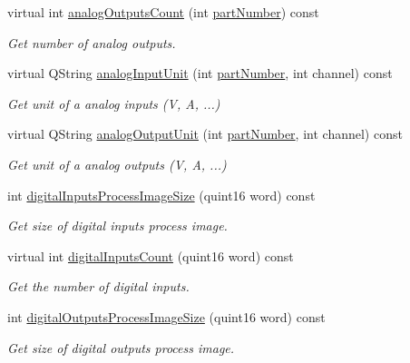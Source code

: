 \begin{DoxyCompactItemize}
virtual int \hyperlink{classmdt_device_modbus_wago_module_ab97fe52c4538a80ccdf5fa1b04c119b6}{analog\-Outputs\-Count} (int \hyperlink{classmdt_device_modbus_wago_module_ab694800ebccf308beb9eeb9a789b0442}{part\-Number}) const 
\begin{DoxyCompactList}\small\item\em Get number of analog outputs. \end{DoxyCompactList}\item 
virtual Q\-String \hyperlink{classmdt_device_modbus_wago_module_adbf2b96c5ab43a1693b5d656f84e893d}{analog\-Input\-Unit} (int \hyperlink{classmdt_device_modbus_wago_module_ab694800ebccf308beb9eeb9a789b0442}{part\-Number}, int channel) const 
\begin{DoxyCompactList}\small\item\em Get unit of a analog inputs (V, A, ...) \end{DoxyCompactList}\item 
virtual Q\-String \hyperlink{classmdt_device_modbus_wago_module_a239892e92ee3f062e1000301766877aa}{analog\-Output\-Unit} (int \hyperlink{classmdt_device_modbus_wago_module_ab694800ebccf308beb9eeb9a789b0442}{part\-Number}, int channel) const 
\begin{DoxyCompactList}\small\item\em Get unit of a analog outputs (V, A, ...) \end{DoxyCompactList}\item 
int \hyperlink{classmdt_device_modbus_wago_module_aec8434b67b73b60f218e0fe4abe0e553}{digital\-Inputs\-Process\-Image\-Size} (quint16 word) const 
\begin{DoxyCompactList}\small\item\em Get size of digital inputs process image. \end{DoxyCompactList}\item 
virtual int \hyperlink{classmdt_device_modbus_wago_module_a96ae9148d769fec6905d360c5262d0eb}{digital\-Inputs\-Count} (quint16 word) const 
\begin{DoxyCompactList}\small\item\em Get the number of digital inputs. \end{DoxyCompactList}\item 
int \hyperlink{classmdt_device_modbus_wago_module_a40513e96468455295608a788eb1d8cac}{digital\-Outputs\-Process\-Image\-Size} (quint16 word) const 
\begin{DoxyCompactList}\small\item\em Get size of digital outputs process image. \end{DoxyCompactList}\item 

\end{DoxyCompactItemize}
